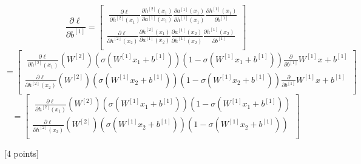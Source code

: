\documentclass{article}
\begin{document}
\begin{itemize}
{$$
\frac{\partial \ell}{\partial b^{[1]}}
= 
\begin{bmatrix} \;
\frac{\partial \ell}{\partial h^{[2]}(x_1)} 
\frac{\partial h^{[2]}(x_1)}{\partial a^{[1]}(x_1)}
\frac{\partial a^{[1]}(x_1)}{\partial h^{[1]}(x_1)} 
\frac{\partial h^{[1]}(x_1)}{\partial b^{[1]}} \\
\frac{\partial \ell}{\partial h^{[2]}(x_2)} 
\frac{\partial h^{[2]}(x_1)}{\partial a^{[1]}(x_2)}
\frac{\partial a^{[1]}(x_2)}{\partial h^{[1]}(x_2)} 
\frac{\partial h^{[1]}(x_2)}{\partial b^{[1]}} \\
\end{bmatrix} \;
$$
$$
=
\begin{bmatrix} \; 
\frac{\partial \ell}{\partial h^{[2]}(x_1)} (W^{[2]}) (\sigma( W^{[1]}x_1 + b^{[1]}))(1-\sigma( W^{[1]}x_1 + b^{[1]}))
\frac{\partial}{\partial b^{[1]}} W^{[1]}x + b^{[1]} \\
\frac{\partial \ell}{\partial h^{[2]}(x_2)} (W^{[2]}) (\sigma( W^{[1]}x_2 + b^{[1]}))(1-\sigma( W^{[1]}x_2 + b^{[1]}))
\frac{\partial}{\partial b^{[1]}} W^{[1]}x + b^{[1]} \\
\end{bmatrix} \;
$$
$$
= 
\begin{bmatrix} \; 
\frac{\partial \ell}{\partial h^{[2]}(x_1)} (W^{[2]}) (\sigma( W^{[1]}x_1 + b^{[1]}))(1-\sigma( W^{[1]}x_1 + b^{[1]})) \\
\frac{\partial \ell}{\partial h^{[2]}(x_2)} (W^{[2]}) (\sigma( W^{[1]}x_2 + b^{[1]}))(1-\sigma( W^{[1]}x_2 + b^{[1]})) \\
\end{bmatrix} \; 
$$
    
    
    
    }
    
\end{itemize}

\noindent {} [4 points]
\end{document}
